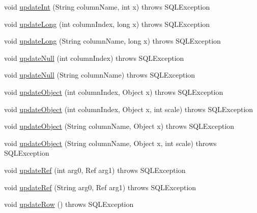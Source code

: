 \begin{DoxyCompactItemize}
void \mbox{\hyperlink{classcom_1_1mysql_1_1jdbc_1_1_result_set_impl_a511245808d1194c70a39d7066ffd0761}{update\+Int}} (String column\+Name, int x)  throws S\+Q\+L\+Exception 
\item 
void \mbox{\hyperlink{classcom_1_1mysql_1_1jdbc_1_1_result_set_impl_a58134de00af85af2be71ff502a060766}{update\+Long}} (int column\+Index, long x)  throws S\+Q\+L\+Exception 
\item 
void \mbox{\hyperlink{classcom_1_1mysql_1_1jdbc_1_1_result_set_impl_a29e1c50192c84c22ab2d81d3ed5b94ee}{update\+Long}} (String column\+Name, long x)  throws S\+Q\+L\+Exception 
\item 
void \mbox{\hyperlink{classcom_1_1mysql_1_1jdbc_1_1_result_set_impl_adf55d3276cbb5778d9e53af63e7670b9}{update\+Null}} (int column\+Index)  throws S\+Q\+L\+Exception 
\item 
void \mbox{\hyperlink{classcom_1_1mysql_1_1jdbc_1_1_result_set_impl_ad2f7b1a741e031324edf8760de259369}{update\+Null}} (String column\+Name)  throws S\+Q\+L\+Exception 
\item 
void \mbox{\hyperlink{classcom_1_1mysql_1_1jdbc_1_1_result_set_impl_a7e7ce7db4f6ce71a461c613244cab080}{update\+Object}} (int column\+Index, Object x)  throws S\+Q\+L\+Exception 
\item 
void \mbox{\hyperlink{classcom_1_1mysql_1_1jdbc_1_1_result_set_impl_a2ff2f59d838994e6dca11645993a7b8a}{update\+Object}} (int column\+Index, Object x, int scale)  throws S\+Q\+L\+Exception 
\item 
void \mbox{\hyperlink{classcom_1_1mysql_1_1jdbc_1_1_result_set_impl_a43aded796528051db3fd9cf6d372c7ba}{update\+Object}} (String column\+Name, Object x)  throws S\+Q\+L\+Exception 
\item 
void \mbox{\hyperlink{classcom_1_1mysql_1_1jdbc_1_1_result_set_impl_afe11d88b9a1ec8645a25ae1fe3e9efdf}{update\+Object}} (String column\+Name, Object x, int scale)  throws S\+Q\+L\+Exception 
\item 
void \mbox{\hyperlink{classcom_1_1mysql_1_1jdbc_1_1_result_set_impl_a0d0258dbd474e1f0519f6d9e4166c9d3}{update\+Ref}} (int arg0, Ref arg1)  throws S\+Q\+L\+Exception 
\item 
void \mbox{\hyperlink{classcom_1_1mysql_1_1jdbc_1_1_result_set_impl_a8ccc94c8e83c3c560779aef0d9bab1ae}{update\+Ref}} (String arg0, Ref arg1)  throws S\+Q\+L\+Exception 
\item 
void \mbox{\hyperlink{classcom_1_1mysql_1_1jdbc_1_1_result_set_impl_a2842d32292d023aaeeafedeed3322981}{update\+Row}} ()  throws S\+Q\+L\+Exception 
\item 

\end{DoxyCompactItemize}
